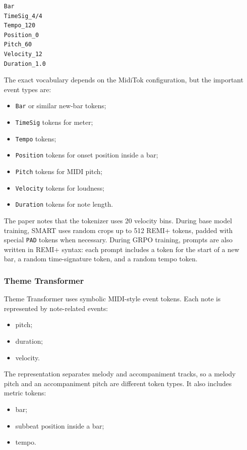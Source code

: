 \documentclass[11pt]{article}
\begin{document}
\begin{verbatim}
Bar
TimeSig_4/4
Tempo_120
Position_0
Pitch_60
Velocity_12
Duration_1.0
\end{verbatim}

The exact vocabulary depends on the MidiTok configuration, but the important
event types are:

\begin{itemize}[leftmargin=*]
  \item \verb|Bar| or similar new-bar tokens;
  \item \verb|TimeSig| tokens for meter;
  \item \verb|Tempo| tokens;
  \item \verb|Position| tokens for onset position inside a bar;
  \item \verb|Pitch| tokens for MIDI pitch;
  \item \verb|Velocity| tokens for loudness;
  \item \verb|Duration| tokens for note length.
\end{itemize}

The paper notes that the tokenizer uses 20 velocity bins. During base model
training, SMART uses random crops up to 512 REMI+ tokens, padded with special
\verb|PAD| tokens when necessary. During GRPO training, prompts are also written
in REMI+ syntax: each prompt includes a token for the start of a new bar, a
random time-signature token, and a random tempo token.

\subsubsection{Theme Transformer}

Theme Transformer uses symbolic MIDI-style event tokens. Each note is represented
by note-related events:

\begin{itemize}[leftmargin=*]
  \item pitch;
  \item duration;
  \item velocity.
\end{itemize}

The representation separates melody and accompaniment tracks, so a melody pitch
and an accompaniment pitch are different token types. It also includes metric
tokens:

\begin{itemize}[leftmargin=*]
  \item bar;
  \item subbeat position inside a bar;
  \item tempo.
\end{itemize}
\end{document}

